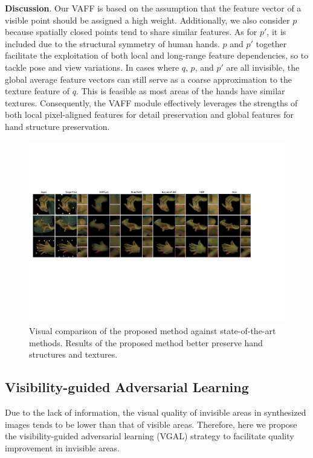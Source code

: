 \documentclass[letterpaper]{article} %
\begin{document}
\textbf{Discussion}. Our VAFF is based on the assumption that the feature vector of a visible point should be assigned a high weight. Additionally, we also consider $p$ because spatially closed points tend to share similar features. As for $p'$, it is included due to the structural symmetry of human hands. $p$ and $p'$ together facilitate the exploitation of both local and long-range feature dependencies, so to tackle pose and view variations. In cases where $q$, $p$, and $p'$ are all invisible, the global average feature vectors can still serve as a coarse approximation to the texture feature of $q$. This is feasible as most areas of the hands have similar textures. Consequently, the VAFF module effectively leverages the strengths of both local pixel-aligned features for detail preservation and global features for hand structure preservation.

\begin{figure}[t]
  \centering
  \includegraphics[width=1.0\hsize]{figures/quality.pdf}
  \caption{Visual comparison of the proposed method against state-of-the-art methods. Results of the proposed method better preserve hand structures and textures.}
  \label{fig:quality}
\end{figure}

\subsection{Visibility-guided Adversarial Learning}
\label{sec:dis}

Due to the lack of information, the visual quality of invisible areas in synthesized images tends to be lower than that of visible areas. Therefore, here we propose the visibility-guided adversarial learning (VGAL) strategy to facilitate quality improvement in invisible areas.
\end{document}
